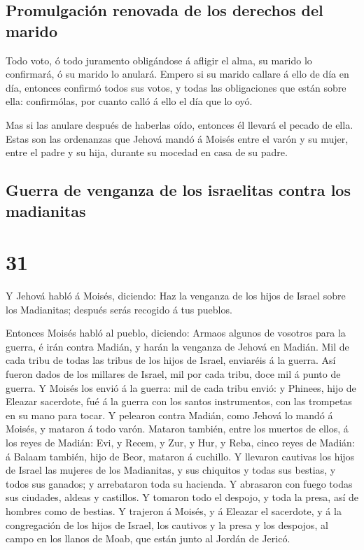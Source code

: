 \hypertarget{promulgaciuxf3n-renovada-de-los-derechos-del-marido}{%
\subsection{Promulgación renovada de los derechos del
marido}\label{promulgaciuxf3n-renovada-de-los-derechos-del-marido}}

 Todo voto, ó todo juramento obligándose á afligir el
alma, su marido lo confirmará, ó su marido lo anulará. 
Empero si su marido callare á ello de día en día, entonces confirmó
todos sus votos, y todas las obligaciones que están sobre ella:
confirmólas, por cuanto calló á ello el día que lo oyó.

 Mas si las anulare después de haberlas oído, entonces él
llevará el pecado de ella. Estas son las ordenanzas que Jehová mandó á
Moisés entre el varón y su mujer, entre el padre y su hija, durante su
mocedad en casa de su padre.

\hypertarget{guerra-de-venganza-de-los-israelitas-contra-los-madianitas}{%
\subsection{Guerra de venganza de los israelitas contra los
madianitas}\label{guerra-de-venganza-de-los-israelitas-contra-los-madianitas}}

\hypertarget{section-30}{%
\section{31}\label{section-30}}

 Y Jehová habló á Moisés, diciendo:  Haz la
venganza de los hijos de Israel sobre los Madianitas; después serás
recogido á tus pueblos.

 Entonces Moisés habló al pueblo, diciendo: Armaos algunos
de vosotros para la guerra, é irán contra Madián, y harán la venganza de
Jehová en Madián.  Mil de cada tribu de todas las tribus
de los hijos de Israel, enviaréis á la guerra.  Así fueron
dados de los millares de Israel, mil por cada tribu, doce mil á punto de
guerra.  Y Moisés los envió á la guerra: mil de cada tribu
envió: y Phinees, hijo de Eleazar sacerdote, fué á la guerra con los
santos instrumentos, con las trompetas en su mano para tocar.
 Y pelearon contra Madián, como Jehová lo mandó á Moisés,
y mataron á todo varón.  Mataron también, entre los
muertos de ellos, á los reyes de Madián: Evi, y Recem, y Zur, y Hur, y
Reba, cinco reyes de Madián: á Balaam también, hijo de Beor, mataron á
cuchillo.  Y llevaron cautivas los hijos de Israel las
mujeres de los Madianitas, y sus chiquitos y todas sus bestias, y todos
sus ganados; y arrebataron toda su hacienda.  Y abrasaron
con fuego todas sus ciudades, aldeas y castillos.  Y
tomaron todo el despojo, y toda la presa, así de hombres como de
bestias.  Y trajeron á Moisés, y á Eleazar el sacerdote,
y á la congregación de los hijos de Israel, los cautivos y la presa y
los despojos, al campo en los llanos de Moab, que están junto al Jordán
de Jericó.

